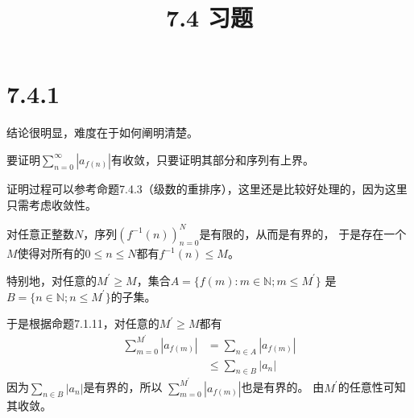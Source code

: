 \documentclass{article}
\theoremstyle{mystyle}
\begin{document}
\title{7.4 习题}
\maketitle

\section*{7.4.1}
结论很明显，难度在于如何阐明清楚。

要证明$\sum \limits_{n=0}^\infty |a_{f(n)}|$有收敛，只要证明其部分和序列有上界。

证明过程可以参考命题7.4.3（级数的重排序），这里还是比较好处理的，因为这里只需考虑收敛性。

对任意正整数$N$，序列$(f^{-1}(n))_{n=0}^N$是有限的，从而是有界的，
于是存在一个$M$使得对所有的$0 \leq n \leq N$都有$f^{-1}(n) \leq M$。

特别地，对任意的$M^\prime \geq M$，集合$A = \{f(m): m \in \mathbb{N}; m \leq M^\prime \}$
是$B = \{n \in \mathbb{N}; n \leq M^\prime\}$的子集。

于是根据命题7.1.11，对任意的$M^\prime \geq M$都有
\begin{align*}
  \sum \limits_{m=0}^{M^\prime} |a_{f(m)}| & = \sum \limits_{n \in A} |a_{f(m)}| \\
                                           & \leq \sum \limits_{n \in B} |a_n|
\end{align*}
因为$\sum \limits_{n \in B} |a_n|$是有界的，所以
$\sum \limits_{m=0}^{M^\prime} |a_{f(m)}|$也是有界的。
由$M^\prime$的任意性可知其收敛。
\end{document}

